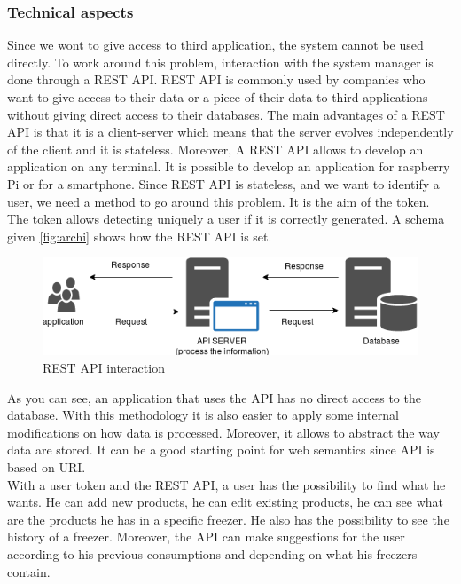 \subsubsection{Technical aspects}
Since we wont to give access to third application, the system cannot be used directly. To work around this problem, interaction with the system manager is done through a REST API. REST API is commonly used by companies who want to give access to their data or a piece of their data to third applications without giving direct access to their databases. The main advantages of a REST API is that it is a client-server which means that the server evolves independently of the client and it is stateless. Moreover, A REST API allows to develop an application on any terminal. It is possible to develop an application for raspberry Pi or for a smartphone. Since REST API is stateless, and we want to identify a user, we need a method to go around this problem. It is the aim of the token. The token allows detecting uniquely a user if it is correctly generated. A schema given \autoref{fig:archi} shows how the REST API is set. \\
\begin{figure}[H]
\centering
\includegraphics[scale=0.5]{./images/archi.png}
\caption{REST API interaction}
\label{fig:archi}
\end{figure}

As you can see, an application that uses the API has no direct access to the database. With this methodology it is also easier to apply some internal modifications on how data is processed. Moreover, it allows to abstract the way data are stored. It can be a good starting point for web semantics since API is based on URI.\\

With a user token and the REST API, a user has the possibility to find what he wants. He can add new products, he can edit existing products, he can see what are the products he has in a specific freezer. He also has the possibility to see the history of a freezer. Moreover, the API can make suggestions for the user according to his previous consumptions and depending on what his freezers contain.\\

